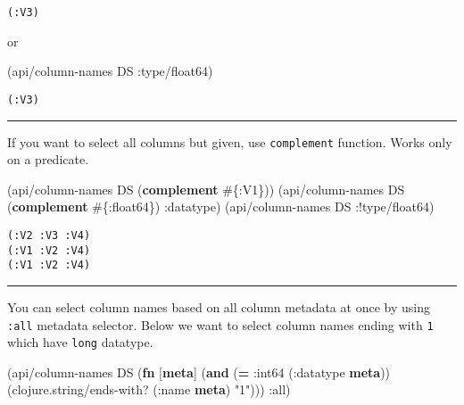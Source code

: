 \documentclass[]{article}
\newenvironment{Shaded}{\begin{snugshade}}{\end{snugshade}}
\newcommand{\AttributeTok}[1]{\textcolor[rgb]{0.77,0.63,0.00}{#1}}
\newcommand{\KeywordTok}[1]{\textcolor[rgb]{0.13,0.29,0.53}{\textbf{#1}}}
\newcommand{\NormalTok}[1]{#1}
\newcommand{\StringTok}[1]{\textcolor[rgb]{0.31,0.60,0.02}{#1}}
\begin{document}
\begin{verbatim}
(:V3)
\end{verbatim}

or

\begin{Shaded}
\begin{Highlighting}[]
\NormalTok{(api/column-names DS }\AttributeTok{:type/float64}\NormalTok{)}
\end{Highlighting}
\end{Shaded}

\begin{verbatim}
(:V3)
\end{verbatim}

\begin{center}\rule{0.5\linewidth}{0.5pt}\end{center}

If you want to select all columns but given, use \texttt{complement}
function. Works only on a predicate.

\begin{Shaded}
\begin{Highlighting}[]
\NormalTok{(api/column-names DS (}\KeywordTok{complement}\NormalTok{ #\{}\AttributeTok{:V1}\NormalTok{\}))}
\NormalTok{(api/column-names DS (}\KeywordTok{complement}\NormalTok{ #\{}\AttributeTok{:float64}\NormalTok{\}) }\AttributeTok{:datatype}\NormalTok{)}
\NormalTok{(api/column-names DS :!type/float64)}
\end{Highlighting}
\end{Shaded}

\begin{verbatim}
(:V2 :V3 :V4)
(:V1 :V2 :V4)
(:V1 :V2 :V4)
\end{verbatim}

\begin{center}\rule{0.5\linewidth}{0.5pt}\end{center}

You can select column names based on all column metadata at once by
using \texttt{:all} metadata selector. Below we want to select column
names ending with \texttt{1} which have \texttt{long} datatype.

\begin{Shaded}
\begin{Highlighting}[]
\NormalTok{(api/column-names DS (}\KeywordTok{fn}\NormalTok{ [}\KeywordTok{meta}\NormalTok{]}
\NormalTok{                       (}\KeywordTok{and}\NormalTok{ (}\KeywordTok{=} \AttributeTok{:int64}\NormalTok{ (}\AttributeTok{:datatype} \KeywordTok{meta}\NormalTok{))}
\NormalTok{                            (clojure.string/ends-with? (}\AttributeTok{:name} \KeywordTok{meta}\NormalTok{) }\StringTok{"1"}\NormalTok{))) }\AttributeTok{:all}\NormalTok{)}
\end{Highlighting}
\end{Shaded}
\end{document}
